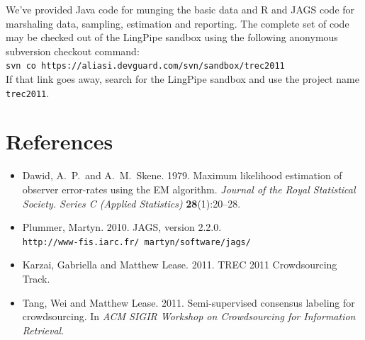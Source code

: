 \documentclass{article}
\begin{document}
We've provided Java code for munging the basic data and R and JAGS
code for marshaling data, sampling, estimation and reporting.  The
complete set of code may be checked out of the LingPipe sandbox
using the following anonymous subversion checkout command:
\\
\hspace*{24pt}
{\tt svn co https://aliasi.devguard.com/svn/sandbox/trec2011}
\\
If that link goes away, search for the LingPipe sandbox and use
the project name {\tt trec2011}.

\section*{References}

\begin{itemize}
%
\item Dawid, A.~P.\ and A.~M.~Skene. 1979.  Maximum likelihood
estimation of observer error-rates using the EM algorithm.  {\it
Journal of the Royal Statistical Society. Series C (Applied
Statistics)} {\bf 28}(1):20--28.
%
\item Plummer, Martyn. 2010.  JAGS, version 2.2.0. 
\\ {\tt http://www-fis.iarc.fr/~martyn/software/jags/}
%
\item Karzai, Gabriella and Matthew Lease. 2011.  TREC 2011
Crowdsourcing Track.
%
\item Tang, Wei and Matthew Lease. 2011.  Semi-supervised consensus
labeling for crowdsourcing. In {\it ACM SIGIR Workshop on Crowdsourcing for
Information Retrieval}.
\end{itemize}
\end{document}
